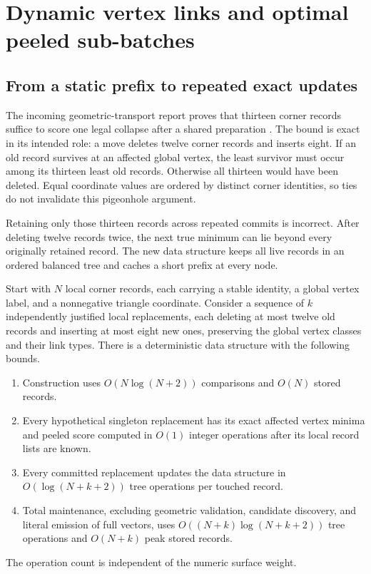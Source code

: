 \section{Dynamic vertex links and optimal peeled sub-batches}
\label{sec:peeling}

\subsection{From a static prefix to repeated exact updates}

The incoming geometric-transport report proves that thirteen corner
records suffice to score one legal collapse after a shared preparation
\cite{priorTransport}. The bound is exact in its intended role: a move
deletes twelve corner records and inserts eight. If an old record
survives at an affected global vertex, the least survivor must occur
among its thirteen least old records. Otherwise all thirteen would have
been deleted. Equal coordinate values are ordered by distinct corner
identities, so ties do not invalidate this pigeonhole argument.

Retaining only those thirteen records across repeated commits is
incorrect. After deleting twelve records twice, the next true minimum
can lie beyond every originally retained record. The new data structure
keeps all live records in an ordered balanced tree and caches a short
prefix at every node.

\begin{theorem}
\label{thm:dynamic-prefix}
Start with $N$ local corner records, each carrying a stable identity,
a global vertex label, and a nonnegative triangle coordinate. Consider
a sequence of $k$ independently justified local replacements, each
deleting at most twelve old records and inserting at most eight new
ones, preserving the global vertex classes and their link types.
There is a deterministic data structure with the following bounds.
\begin{enumerate}[label=(\roman*)]
\item Construction uses $O(N\log(N+2))$ comparisons and $O(N)$ stored records.
\item Every hypothetical singleton replacement has its exact affected
vertex minima and peeled score computed in $O(1)$ integer operations
after its local record lists are known.
\item Every committed replacement updates the data structure in
$O(\log(N+k+2))$ tree operations per touched record.
\item Total maintenance, excluding geometric validation, candidate
discovery, and literal emission of full vectors, uses
$O((N+k)\log(N+k+2))$ tree operations and $O(N+k)$ peak stored records.
\end{enumerate}
The operation count is independent of the numeric surface weight.
\end{theorem}

